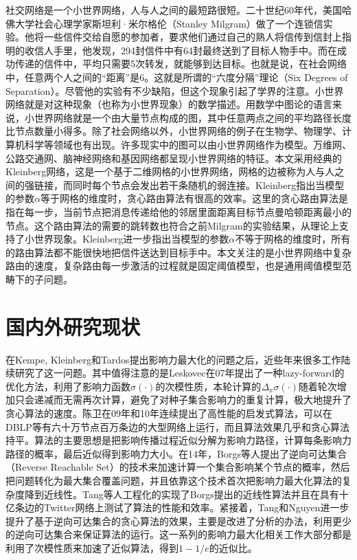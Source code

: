 社交网络是一个小世界网络，人与人之间的最短路很短。二十世纪60年代，美国哈佛大学社会心理学家斯坦利·米尔格伦（Stanley Milgram）做了一个连锁信实验\cite{Milgram1967small}。他将一些信件交给自愿的参加者，要求他们通过自己的熟人将信传到信封上指明的收信人手里，他发现，294封信件中有64封最终送到了目标人物手中。而在成功传递的信件中，平均只需要5次转发，就能够到达目标。也就是说，在社会网络中，任意两个人之间的“距离”是6。这就是所谓的“六度分隔”理论（Six Degrees of Separation）。尽管他的实验有不少缺陷，但这个现象引起了学界的注意。小世界网络就是对这种现象（也称为小世界现象）的数学描述。用数学中图论的语言来说，小世界网络就是一个由大量节点构成的图，其中任意两点之间的平均路径长度比节点数量小得多。除了社会网络以外，小世界网络的例子在生物学、物理学、计算机科学等领域也有出现。许多现实中的图可以由小世界网络作为模型。万维网、公路交通网、脑神经网络和基因网络都呈现小世界网络的特征。本文采用经典的Kleinberg网络\cite{Kleinberg2000small}，这是一个基于二维网格的小世界网络，网格的边被称为人与人之间的强链接，而同时每个节点会发出若干条随机的弱连接。Kleinberg指出当模型的参数$\alpha$等于网格的维度时，贪心路由算法有很高的效率。这里的贪心路由算法是指在每一步，当前节点把消息传递给他的邻居里面距离目标节点曼哈顿距离最小的节点。这个路由算法的需要的跳转数也符合之前Milgram的实验结果，从理论上支持了小世界现象。Kleinberg进一步指出当模型的参数$\alpha$不等于网格的维度时，所有的路由算法都不能很快地把信件送达到目标手中。本文关注的是小世界网络中复杂路由的速度，复杂路由每一步激活的过程就是固定阈值模型，也是通用阈值模型范畴下的子问题。


\section{国内外研究现状}
在Kempe, Kleinberg和Tardos\cite{Kempe2003maximizing}提出影响力最大化的问题之后，近些年来很多工作陆续研究了这一问题\cite{bharathi2007competitive,Leskovec2007celf,Chen2009efficient,chen2010sharpphard,Goyal2011simpath}。其中值得注意的是Leskovec\cite{Leskovec2007celf}在07年提出了一种lazy-forward的优化方法，利用了影响力函数$\sigma(\cdot)$的次模性质，本轮计算的$\Delta_x\sigma(\cdot)$随着轮次增加只会递减而无需再次计算，避免了对种子集合影响力的重复计算，极大地提升了贪心算法的速度。陈卫在09年\cite{Chen2009efficient}和10年\cite{chen2010sharpphard}连续提出了高性能的启发式算法，可以在DBLP等有六十万节点百万条边的大型网络上运行，而且算法效果几乎和贪心算法持平。算法的主要思想是把影响传播过程近似分解为影响力路径，计算每条影响力路径的概率，最后近似得到影响力大小。在14年，Borgs等人\cite{borgs2014rrset}提出了逆向可达集合（Reverse Reachable Set）的技术来加速计算一个集合影响某个节点的概率，然后把问题转化为最大集合覆盖问题，并且依靠这个技术首次把影响力最大化算法的复杂度降到近线性。Tang等人\cite{tang2014newrrset}工程化的实现了Borgs提出的近线性算法并且在具有十亿条边的Twitter网络上测试了算法的性能和效率。紧接着，Tang\cite{tang2015influence}和Nguyen\cite{mtai2016sigmod}进一步提升了基于逆向可达集合的贪心算法的效果，主要是改进了分析的办法，利用更少的逆向可达集合来保证算法的运行。这一系列的影响力最大化相关工作大部分都是利用了次模性质来加速了近似算法，得到$1-1/e$的近似比。

